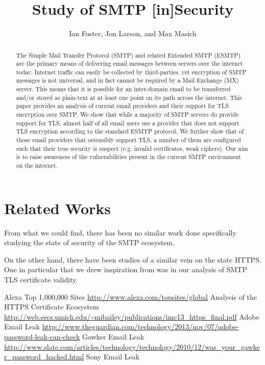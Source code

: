 \documentclass[11pt, twocolumn]{article}
\author{Ian Foster, Jon Larson, and Max Masich}
\title{Study of SMTP [in]Security}
\date{}
\begin{document}
\maketitle

\begin{abstract}
The Simple Mail Transfer Protocol (SMTP) and related Extended SMTP (ESMTP) are 
the primary means of delivering email messages between servers over the internet 
today.  Internet traffic can easily be collected by third-parties, yet 
encryption of SMTP messages is not universal, and in fact cannot be required by 
a Mail Exchange (MX) server.  This means that it is possible for an inter-domain 
email to be transferred and/or stored as plain-text at at least one point on its 
path across the internet.  This paper provides an analysis of current email 
providers and their support for TLS encryption over SMTP.  We show that while a 
majority of SMTP servers do provide support for TLS, almost half of all email 
users use a provider that does not support TLS encryption according to the 
standard ESMTP protocol.  We further show that of those email providers that 
ostensibly support TLS, a number of them are configured such that their true 
security is suspect (e.g. invalid certificates, weak ciphers).  Our aim is to 
raise awareness of the vulnerabilities present in the current SMTP environment
on the internet.
\end{abstract}




\section{Related Works}
From what we could find, there has been no similar work done specifically 
studying the state of security of the SMTP ecosystem. 

On the other hand, there have been studies of a similar vein on the state HTTPS. 
One in particular that we drew inspiration from was \cite{https} in our analysis 
of SMTP TLS certificate validity. 







\begin{thebibliography}{1}
        Alexa Top 1,000,000 Sites\linebreak
        \url{http://www.alexa.com/topsites/global}
        Analysis of the HTTPS Certiﬁcate Ecosystem\linebreak
        \url{http://web.eecs.umich.edu/~mibailey/publications/imc13\_https\_final.pdf}
        Adobe Email Leak\linebreak
        \url{http://www.theguardian.com/technology/2013/nov/07/adobe-password-leak-can-check}
        Gawker Email Leak\linebreak
        \url{http://www.slate.com/articles/technology/technology/2010/12/was\_your\_gawker\_password\_hacked.html}
        Sony Email Leak\linebreak
\end{thebibliography}
\end{document}
